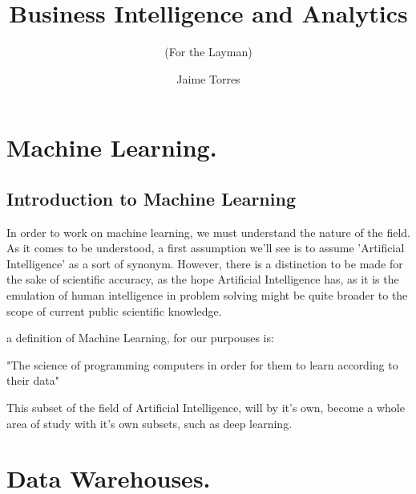 \documentclass{textbook}
\title     {Business Intelligence and Analytics}
\subtitle  {(For the Layman)}
\author    {Jaime Torres}
\begin{document}
\tableofcontents

\part{Machine Learning.}

\chapter{Introduction to Machine Learning}

In order to work on machine learning, we must understand the nature of the field. As it comes to be understood, a 
first assumption we'll see is to assume 'Artificial Intelligence' as a sort of synonym. However, there is a distinction
to be made for the sake of scientific accuracy, as the hope Artificial Intelligence has, as it is the emulation of human 
intelligence in problem solving might be quite broader to the scope of current public scientific knowledge. 

a definition of Machine Learning, for our purpouses is:

"The science of programming computers in order for them to learn according to their data"

This subset of the field of Artificial Intelligence, will by it's own, become a whole area of study with it's own subsets, such as 
deep learning. 

\part{Data Warehouses.}
\end{document}
